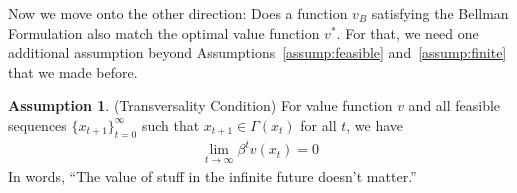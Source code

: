 \documentclass[12pt]{article}
\numberwithin{equation}{section} %
\theoremstyle{plain}
\theoremstyle{definition}
\newtheorem{assump}[thm]{Assumption}
\theoremstyle{remark}
\begin{document}
Now we move onto the other direction: Does a function $v_B$ satisfying
the Bellman Formulation also match the optimal value function $v^*$. For
that, we need one additional assumption beyond
Assumptions~\ref{assump:feasible} and~\ref{assump:finite} that we made
before.

\begin{assump}{(Transversality Condition)}
\label{assump:transversality}
For value function $v$ and all feasible sequences
$\{x_{t+1}\}_{t=0}^\infty$ such that $x_{t+1}\in \Gamma(x_t)$ for all
$t$, we have
\begin{align*}
  \lim_{t\rightarrow\infty} \beta^t v(x_t) = 0
\end{align*}
In words, ``The value of stuff in the infinite future doesn't matter.''
\end{assump}
\end{document}
